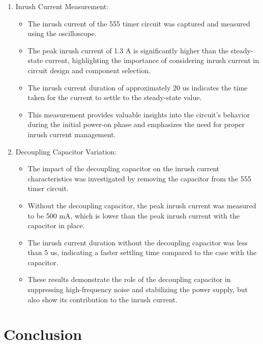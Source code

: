 \documentclass[a4paper,11pt]{article}%
\begin{document}
\begin{enumerate}
	\item Inrush Current Measurement:\
	      \begin{itemize}
		      \item The inrush current of the 555 timer circuit was captured and measured using the oscilloscope.
		      \item The peak inrush current of 1.3 A is significantly higher than the steady-state current, highlighting the importance of considering inrush current in circuit design and component selection.
		      \item The inrush current duration of approximately 20 us indicates the time taken for the current to settle to the steady-state value.
		      \item This measurement provides valuable insights into the circuit's behavior during the initial power-on phase and emphasizes the need for proper inrush current management.
	      \end{itemize}
	\item Decoupling Capacitor Variation:\
	      \begin{itemize}
		      \item The impact of the decoupling capacitor on the inrush current characteristics was investigated by removing the capacitor from the 555 timer circuit.
		      \item Without the decoupling capacitor, the peak inrush current was measured to be 500 mA, which is lower than the peak inrush current with the capacitor in place.
		      \item The inrush current duration without the decoupling capacitor was less than 5 us, indicating a faster settling time compared to the case with the capacitor.
		      \item These results demonstrate the role of the decoupling capacitor in suppressing high-frequency noise and stabilizing the power supply, but also show its contribution to the inrush current.

	      \end{itemize}



\end{enumerate}

\section{Conclusion}
\end{document}
